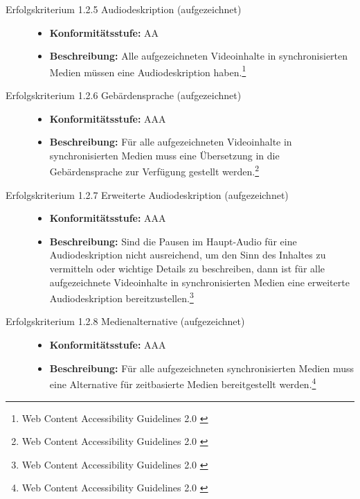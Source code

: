 \begin{description}
\begin{description}
		\item[Erfolgskriterium 1.2.5 Audiodeskription (aufgezeichnet)]\hfill
		\begin{itemize}
			\item \textbf{Konformitätsstufe:} AA
			\item \textbf{Beschreibung:} Alle aufgezeichneten Videoinhalte in synchronisierten Medien müssen eine Audiodeskription 
			haben.\footnote{Web Content Accessibility Guidelines 2.0 \cite{WCAG2.0}}
		\end{itemize}
			
		\item[Erfolgskriterium 1.2.6 Gebärdensprache (aufgezeichnet)]\hfill
		\begin{itemize}
			\item \textbf{Konformitätsstufe:} AAA
			\item \textbf{Beschreibung:} Für alle aufgezeichneten Videoinhalte in synchronisierten Medien muss eine Übersetzung in die Gebärdensprache zur 
			Verfügung gestellt werden.\footnote{Web Content Accessibility Guidelines 2.0 \cite{WCAG2.0}}
		\end{itemize}
			
		\item[Erfolgskriterium 1.2.7 Erweiterte Audiodeskription (aufgezeichnet)]\hfill
		\begin{itemize}
			\item \textbf{Konformitätsstufe:} AAA
			\item \textbf{Beschreibung:} Sind die Pausen im Haupt-Audio für eine Audiodeskription nicht ausreichend, um den Sinn des Inhaltes zu vermitteln oder 
			wichtige Details zu beschreiben, dann ist für alle aufgezeichnete Videoinhalte in synchronisierten Medien eine erweiterte 
			Audiodeskription bereitzustellen.\footnote{Web Content Accessibility Guidelines 2.0 \cite{WCAG2.0}}
		\end{itemize}
			
		\item[Erfolgskriterium 1.2.8 Medienalternative (aufgezeichnet)]\hfill
		\begin{itemize}
			\item \textbf{Konformitätsstufe:} AAA
			\item \textbf{Beschreibung:} Für alle aufgezeichneten synchronisierten Medien muss eine Alternative für zeitbasierte Medien bereitgestellt 
			werden.\footnote{Web Content Accessibility Guidelines 2.0 \cite{WCAG2.0}}
		\end{itemize}
			

\end{description}
\end{description}
